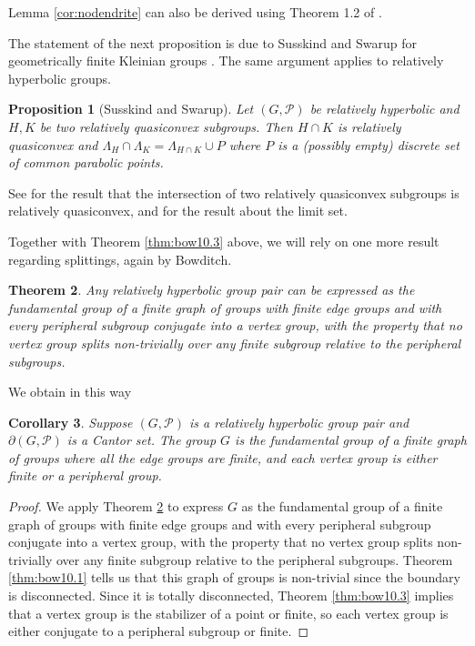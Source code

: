 \documentclass[11pt]{article}
\newtheorem{theorem}{Theorem}[section]
\newtheorem{cor}[theorem]{Corollary}
\newtheorem{proposition}[theorem]{Proposition}
\theoremstyle{definition}
\newcommand\PP{\mathcal{P}}
\begin{document}
Lemma \ref{cor:nodendrite} can also be derived using Theorem   1.2 of \cite{Dasgupta:Hruska}. 

\medskip

The
statement of the next proposition is due to Susskind and Swarup for geometrically finite Kleinian groups \cite[Thm 3]{susskind:swarup}. 
The same argument applies to relatively hyperbolic groups.

\begin{proposition}[Susskind and Swarup]\label{suswarup} 
Let $(G,\PP)$ be relatively hyperbolic and $H,K$ be two
relatively quasiconvex subgroups. Then  $H\cap K$ is relatively quasiconvex and
$ \Lambda_H\cap \Lambda_K= \Lambda_{H\cap K} \cup P$ where $P$ is a (possibly empty) 
discrete set of common parabolic points.\end{proposition}

See \cite[Theorem 1.2(2)]{Hruskasurvey} for the result that the intersection of two relatively quasiconvex subgroups is relatively quasiconvex, and \cite{Yang} for the result about the limit set.

\medskip

Together with Theorem \ref{thm:bow10.3} above, we will rely on one more result regarding splittings, again by Bowditch.

\begin{theorem}\cite[Theorem 10.2]{bowrelhyp}\label{thm:bow10.2}
Any relatively hyperbolic group pair can be expressed as the fundamental group of a finite graph of groups with finite edge groups and with every peripheral subgroup conjugate into a vertex group, with the property that no vertex group splits non-trivially over any finite subgroup relative to the peripheral subgroups.
\end{theorem} 





We obtain in this way

\begin{cor}\label{cor:bow} Suppose $(G,\mathcal{P})$ is a relatively hyperbolic group pair and  $\partial(G, \mathcal{P})$ is a Cantor set. 
The group $G$ is the fundamental group of a finite graph of groups  where all the edge groups are finite, and each vertex group is either finite or a peripheral group.  
\end{cor}

\begin{proof} We apply Theorem \ref{thm:bow10.2} to express $G$ as the fundamental group of a finite graph of groups with finite edge groups and with every peripheral subgroup conjugate into a vertex group, with the property that no vertex group splits non-trivially over any finite subgroup relative to the peripheral subgroups. Theorem \ref{thm:bow10.1} tells us that this graph of groups is non-trivial since the boundary
is disconnected. Since it is totally disconnected, Theorem \ref{thm:bow10.3} implies that a vertex group is the stabilizer of a point or 
{finite}, so each vertex group is either conjugate to a peripheral subgroup or  finite. 
 \end{proof}
\end{document}
